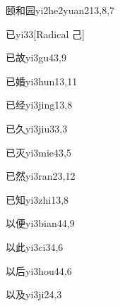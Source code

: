 \begin{entry}{颐和园}{yi2he2yuan2}{13,8,7}
\end{entry}

\begin{entry}{已}{yi3}{3}[Radical 己]
\end{entry}

\begin{entry}{已故}{yi3gu4}{3,9}
\end{entry}

\begin{entry}{已婚}{yi3hun1}{3,11}
\end{entry}

\begin{entry}{已经}{yi3jing1}{3,8}
\end{entry}

\begin{entry}{已久}{yi3jiu3}{3,3}
\end{entry}

\begin{entry}{已灭}{yi3mie4}{3,5}
\end{entry}

\begin{entry}{已然}{yi3ran2}{3,12}
\end{entry}

\begin{entry}{已知}{yi3zhi1}{3,8}
\end{entry}

\begin{entry}{以便}{yi3bian4}{4,9}
\end{entry}

\begin{entry}{以此}{yi3ci3}{4,6}
\end{entry}

\begin{entry}{以后}{yi3hou4}{4,6}
\end{entry}

\begin{entry}{以及}{yi3ji2}{4,3}
\end{entry}

